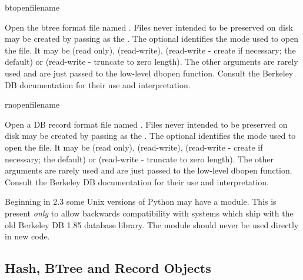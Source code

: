\begin{funcdesc}{btopen}{filename}

Open the btree format file named .  Files never intended 
to be preserved on disk may be created by passing  as the 
.  The optional
 identifies the mode used to open the file.  It may be
 (read only),  (read-write),
 (read-write - create if necessary; the default) or
 (read-write - truncate to zero length).  The other
arguments are rarely used and are just passed to the low-level dbopen
function.  Consult the Berkeley DB documentation for their use and
interpretation.
\end{funcdesc}

\begin{funcdesc}{rnopen}{filename}

Open a DB record format file named .  Files never intended 
to be preserved on disk may be created by passing  as the 
.  The optional
 identifies the mode used to open the file.  It may be
 (read only),  (read-write),
 (read-write - create if necessary; the default) or
 (read-write - truncate to zero length).  The other
arguments are rarely used and are just passed to the low-level dbopen
function.  Consult the Berkeley DB documentation for their use and
interpretation.
\end{funcdesc}


\begin{notice}
Beginning in 2.3 some Unix versions of Python may have a 
module.  This is present \emph{only} to allow backwards compatibility with
systems which ship with the old Berkeley DB 1.85 database library.  The
 module should never be used directly in new code.
\end{notice}


\begin{seealso}
\end{seealso}

\subsection{Hash, BTree and Record Objects \label{bsddb-objects}}

